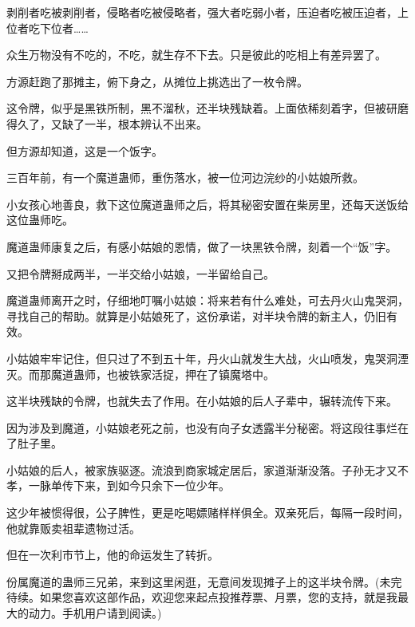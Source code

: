 \begin{this_body}
剥削者吃被剥削者，侵略者吃被侵略者，强大者吃弱小者，压迫者吃被压迫者，上位者吃下位者……

众生万物没有不吃的，不吃，就生存不下去。只是彼此的吃相上有差异罢了。

方源赶跑了那摊主，俯下身之，从摊位上挑选出了一枚令牌。

这令牌，似乎是黑铁所制，黑不溜秋，还半块残缺着。上面依稀刻着字，但被研磨得久了，又缺了一半，根本辨认不出来。

但方源却知道，这是一个饭字。

三百年前，有一个魔道蛊师，重伤落水，被一位河边浣纱的小姑娘所救。

小女孩心地善良，救下这位魔道蛊师之后，将其秘密安置在柴房里，还每天送饭给这位蛊师吃。

魔道蛊师康复之后，有感小姑娘的恩情，做了一块黑铁令牌，刻着一个“饭”字。

又把令牌掰成两半，一半交给小姑娘，一半留给自己。

魔道蛊师离开之时，仔细地叮嘱小姑娘：将来若有什么难处，可去丹火山鬼哭洞，寻找自己的帮助。就算是小姑娘死了，这份承诺，对半块令牌的新主人，仍旧有效。

小姑娘牢牢记住，但只过了不到五十年，丹火山就发生大战，火山喷发，鬼哭洞湮灭。而那魔道蛊师，也被铁家活捉，押在了镇魔塔中。

这半块残缺的令牌，也就失去了作用。在小姑娘的后人子辈中，辗转流传下来。

因为涉及到魔道，小姑娘老死之前，也没有向子女透露半分秘密。将这段往事烂在了肚子里。

小姑娘的后人，被家族驱逐。流浪到商家城定居后，家道渐渐没落。子孙无才又不孝，一脉单传下来，到如今只余下一位少年。

这少年被惯得很，公子脾性，更是吃喝嫖赌样样俱全。双亲死后，每隔一段时间，他就靠贩卖祖辈遗物过活。

但在一次利市节上，他的命运发生了转折。

份属魔道的蛊师三兄弟，来到这里闲逛，无意间发现摊子上的这半块令牌。(未完待续。如果您喜欢这部作品，欢迎您来起点投推荐票、月票，您的支持，就是我最大的动力。手机用户请到阅读。)

\end{this_body}

